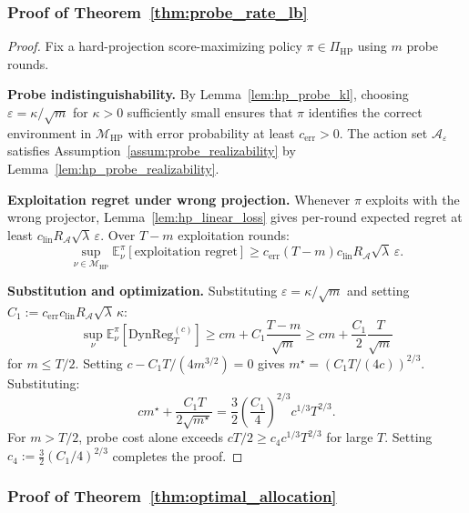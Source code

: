 \documentclass{article}
\newcommand{\E}{\mathbb{E}}
\newcommand{\cA}{\mathcal{A}}
\newcommand{\DynReg}{\mathrm{DynReg}}
\begin{document}
\subsubsection{Proof of Theorem~\ref{thm:probe_rate_lb}}
\label{proof:probe_rate_lb}

\begin{proof}
Fix a hard-projection score-maximizing policy $\pi \in \Pi_{\mathrm{HP}}$ using $m$ probe rounds.

\textbf{Probe indistinguishability.}
By Lemma~\ref{lem:hp_probe_kl}, choosing $\varepsilon = \kappa/\sqrt{m}$ for $\kappa > 0$ sufficiently small ensures that $\pi$ identifies the correct environment in $\mathcal{M}_{\mathrm{HP}}$ with error probability at least $c_{\mathrm{err}} > 0$.
The action set $\cA_\varepsilon$ satisfies Assumption~\ref{assum:probe_realizability} by Lemma~\ref{lem:hp_probe_realizability}.

\textbf{Exploitation regret under wrong projection.}
Whenever $\pi$ exploits with the wrong projector, Lemma~\ref{lem:hp_linear_loss} gives per-round expected regret at least $c_{\mathrm{lin}} R_{\cA}\sqrt{\lambda}\,\varepsilon$.  Over $T - m$ exploitation rounds:
\[
\sup_{\nu \in \mathcal{M}_{\mathrm{HP}}} \E_\nu^\pi[\text{exploitation regret}]
\ge c_{\mathrm{err}}(T - m) c_{\mathrm{lin}} R_{\cA}\sqrt{\lambda}\,\varepsilon.
\]

\textbf{Substitution and optimization.}
Substituting $\varepsilon = \kappa/\sqrt{m}$ and setting $C_1 := c_{\mathrm{err}} c_{\mathrm{lin}} R_{\cA}\sqrt{\lambda}\,\kappa$:
\[
\sup_{\nu} \E_\nu^\pi[\DynReg_T^{(c)}]
\ge cm + C_1\frac{T - m}{\sqrt{m}}
\ge cm + \frac{C_1}{2}\frac{T}{\sqrt{m}}
\]
for $m \le T/2$.  Setting $c - C_1 T/(4m^{3/2}) = 0$ gives $m^\star = (C_1 T/(4c))^{2/3}$.  Substituting:
\[
cm^\star + \frac{C_1 T}{2\sqrt{m^\star}} = \frac{3}{2}\left(\frac{C_1}{4}\right)^{2/3} c^{1/3} T^{2/3}.
\]
For $m > T/2$, probe cost alone exceeds $cT/2 \ge c_4 c^{1/3}T^{2/3}$ for large $T$.
Setting $c_4 := \frac{3}{2}(C_1/4)^{2/3}$ completes the proof.
\end{proof}

\subsubsection{Proof of Theorem~\ref{thm:optimal_allocation}}
\label{proof:optimal_allocation}
\end{document}
